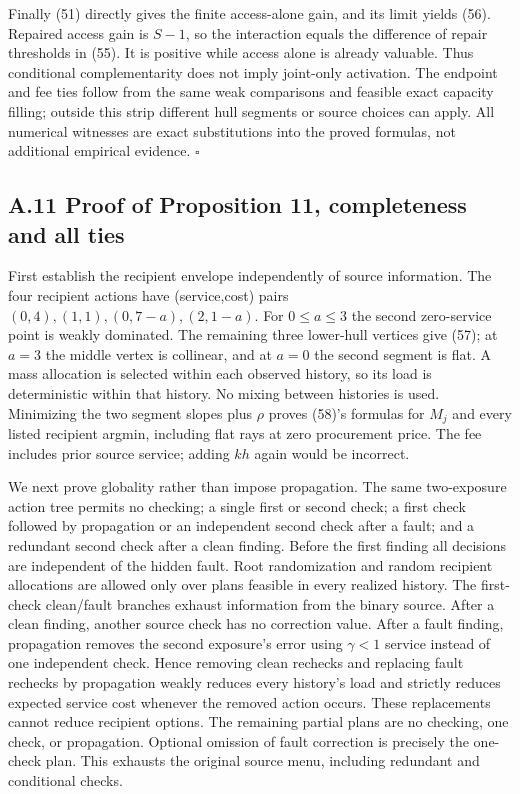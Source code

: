\documentclass[
  11pt,
  a4paper,
]{article}
\begin{document}
Finally (51) directly gives the finite access-alone gain, and its limit
yields (56). Repaired access gain is \(S-1\), so the interaction equals
the difference of repair thresholds in (55). It is positive while access
alone is already valuable. Thus conditional complementarity does not
imply joint-only activation. The endpoint and fee ties follow from the
same weak comparisons and feasible exact capacity filling; outside this
strip different hull segments or source choices can apply. All numerical
witnesses are exact substitutions into the proved formulas, not
additional empirical evidence. \(\square\)

\hypertarget{a.11-proof-of-proposition-11-completeness-and-all-ties}{%
\subsection{A.11 Proof of Proposition 11, completeness and all
ties}\label{a.11-proof-of-proposition-11-completeness-and-all-ties}}

First establish the recipient envelope independently of source
information. The four recipient actions have (service,cost) pairs
\((0,4),(1,1),(0,7-a),(2,1-a)\). For \(0\leq a\leq3\) the second
zero-service point is weakly dominated. The remaining three lower-hull
vertices give (57); at \(a=3\) the middle vertex is collinear, and at
\(a=0\) the second segment is flat. A mass allocation is selected within
each observed history, so its load is deterministic within that history.
No mixing between histories is used. Minimizing the two segment slopes
plus \(\rho\) proves (58)'s formulas for \(M_j\) and every listed
recipient argmin, including flat rays at zero procurement price. The fee
includes prior source service; adding \(kh\) again would be incorrect.

We next prove globality rather than impose propagation. The same
two-exposure action tree permits no checking; a single first or second
check; a first check followed by propagation or an independent second
check after a fault; and a redundant second check after a clean finding.
Before the first finding all decisions are independent of the hidden
fault. Root randomization and random recipient allocations are allowed
only over plans feasible in every realized history. The first-check
clean/fault branches exhaust information from the binary source. After a
clean finding, another source check has no correction value. After a
fault finding, propagation removes the second exposure's error using
\(\gamma<1\) service instead of one independent check. Hence removing
clean rechecks and replacing fault rechecks by propagation weakly
reduces every history's load and strictly reduces expected service cost
whenever the removed action occurs. These replacements cannot reduce
recipient options. The remaining partial plans are no checking, one
check, or propagation. Optional omission of fault correction is
precisely the one-check plan. This exhausts the original source menu,
including redundant and conditional checks.
\end{document}
